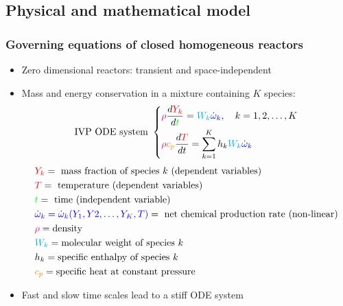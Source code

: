 \documentclass{beamer}
\begin{document}
\subsection{Physical and mathematical model}
\begin{frame}
\frametitle{Governing equations of closed homogeneous reactors}
\begin{footnotesize}
\begin{itemize}
  \item Zero dimensional reactors: transient and space-independent
  \item Mass and energy conservation in a mixture containing $K$ species:
  \begin{equation*}
    \text{IVP ODE system }
    \begin{dcases}
      \textcolor{magenta}{\rho} \frac{d\textcolor{red}{Y_k}}{d\textcolor{green}{t}} = 
      \textcolor{cyan}{W_k} \textcolor{blue}{\dot\omega_k}, \quad k = 1,2, \ldots, K \\
      \textcolor{magenta}{\rho} \textcolor{orange}{c_p} \frac{d\textcolor{red}{T}}{dt} = 
      \sum_{k=1}^K h_k \textcolor{cyan}{W_k} \textcolor{blue}{\dot\omega_k}
    \end{dcases}
  \end{equation*}
  \begin{equation*}
    \begin{aligned}
      &\textcolor{red}{Y_k} = \text{ mass fraction of species } k \text{ (dependent variables)}\\
      &\textcolor{red}{T} = \text{ temperature (dependent variables)}\\
      &\textcolor{green}{t} = \text{ time (independent variable)}\\
      &\textcolor{blue}{\dot\omega_k = \dot\omega_k(Y_1,Y2, \ldots, Y_K, T)} 
       = \text{ net chemical production rate (non-linear)}\\
      &\textcolor{magenta}{\rho} = \text{density} \\
      &\textcolor{cyan}{W_k} =\text{molecular weight of species } k\\
      &h_k =\text{specific enthalpy of species } k\\
      &\textcolor{orange}{c_p} =\text{specific heat at constant pressure}
    \end{aligned}
  \end{equation*}
  \item Fast and slow time scales lead to a stiff ODE system
\end{itemize}
\end{footnotesize}
\end{frame}
\end{document}
